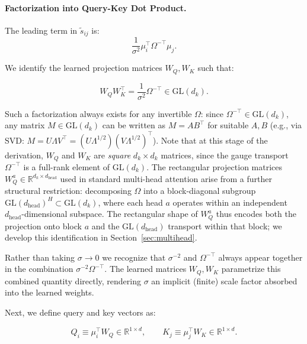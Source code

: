 \documentclass[twoside,11pt]{article}
\begin{document}
\paragraph{Factorization into Query-Key Dot Product.}

The leading term in $\tilde{s}_{ij}$ is:
\begin{equation}
\frac{1}{\sigma^2}\mu_i^\top \Omega^{-\top} \mu_j.
\end{equation}

We identify the learned projection matrices $W_Q, W_K$ such that:

\begin{equation}
W_Q W_K^\top = \frac{1}{\sigma^2} \Omega^{-\top} \in \mathrm{GL}(d_k).
\end{equation}

Such a factorization always exists for any invertible $\Omega$: since $\Omega^{-\top} \in \mathrm{GL}(d_k)$, any matrix $M \in \mathrm{GL}(d_k)$ can be written as $M = AB^\top$ for suitable $A, B$ (e.g., via SVD: $M = U\Lambda V^\top = (U\Lambda^{1/2})(V\Lambda^{1/2})^\top$).
Note that at this stage of the derivation, $W_Q$ and $W_K$ are \emph{square} $d_k \times d_k$ matrices, since the gauge transport $\Omega^{-\top}$ is a full-rank element of $\mathrm{GL}(d_k)$. The rectangular projection matrices $W_Q^a \in \mathbb{R}^{d_k \times d_{\text{head}}}$ used in standard multi-head attention arise from a further structural restriction: decomposing $\Omega$ into a block-diagonal subgroup $\mathrm{GL}(d_{\text{head}})^H \subset \mathrm{GL}(d_k)$, where each head $a$ operates within an independent $d_{\text{head}}$-dimensional subspace. The rectangular shape of $W_Q^a$ thus encodes both the projection onto block $a$ and the $\mathrm{GL}(d_{\text{head}})$ transport within that block; we develop this identification in Section~\ref{sec:multihead}.

Rather than taking $\sigma \to 0$ we recognize that $\sigma^{-2}$ and $\Omega^{-\top}$ always appear together in the combination $\sigma^{-2}\Omega^{-\top}$. The learned matrices $W_Q, W_K$ parametrize this combined quantity directly, rendering $\sigma$ an implicit (finite) scale factor absorbed into the learned weights.


Next, we define query and key vectors as:

\begin{equation}
Q_i \equiv \mu_i^\top W_Q \in \mathbb{R}^{1\times d}, \qquad K_j \equiv \mu_j^\top W_K \in \mathbb{R}^{1\times d}.
\end{equation}
\end{document}

